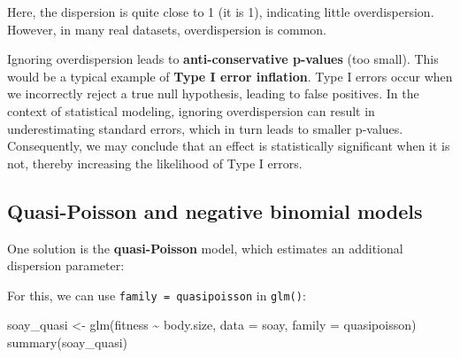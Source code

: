 \documentclass[
  letterpaper,
  8pt,
  a4paper]{book}
\newenvironment{Shaded}{\begin{snugshade}}{\end{snugshade}}
\newcommand{\AttributeTok}[1]{\textcolor[rgb]{0.40,0.45,0.13}{#1}}
\newcommand{\FunctionTok}[1]{\textcolor[rgb]{0.28,0.35,0.67}{#1}}
\newcommand{\NormalTok}[1]{\textcolor[rgb]{0.00,0.23,0.31}{#1}}
\newcommand{\OtherTok}[1]{\textcolor[rgb]{0.00,0.23,0.31}{#1}}
\newcommand{\SpecialCharTok}[1]{\textcolor[rgb]{0.37,0.37,0.37}{#1}}
\begin{document}
Here, the dispersion is quite close to 1 (it is 1), indicating little
overdispersion. However, in many real datasets, overdispersion is
common.

\begin{tcolorbox}[enhanced jigsaw, arc=.35mm, bottomrule=.15mm, bottomtitle=1mm, breakable, colback=white, colbacktitle=quarto-callout-caution-color!10!white, colframe=quarto-callout-caution-color-frame, coltitle=black, left=2mm, leftrule=.75mm, opacityback=0, opacitybacktitle=0.6, rightrule=.15mm, title=\textcolor{quarto-callout-caution-color}{\faFire}\hspace{0.5em}{Caution}, titlerule=0mm, toprule=.15mm, toptitle=1mm]

Ignoring overdispersion leads to \textbf{anti-conservative p-values}
(too small). This would be a typical example of \textbf{Type I error
inflation}. Type I errors occur when we incorrectly reject a true null
hypothesis, leading to false positives. In the context of statistical
modeling, ignoring overdispersion can result in underestimating standard
errors, which in turn leads to smaller p-values. Consequently, we may
conclude that an effect is statistically significant when it is not,
thereby increasing the likelihood of Type I errors.

\end{tcolorbox}

\subsection*{Quasi-Poisson and negative binomial
models}\label{quasi-poisson-and-negative-binomial-models}

One solution is the \textbf{quasi-Poisson} model, which estimates an
additional dispersion parameter:

For this, we can use \texttt{family\ =\ quasipoisson} in \texttt{glm()}:

\begin{Shaded}
\begin{Highlighting}[]
\NormalTok{soay\_quasi }\OtherTok{\textless{}{-}} \FunctionTok{glm}\NormalTok{(fitness }\SpecialCharTok{\textasciitilde{}}\NormalTok{ body.size, }\AttributeTok{data =}\NormalTok{ soay, }\AttributeTok{family =}\NormalTok{ quasipoisson)}
\FunctionTok{summary}\NormalTok{(soay\_quasi)}
\end{Highlighting}
\end{Shaded}
\end{document}
